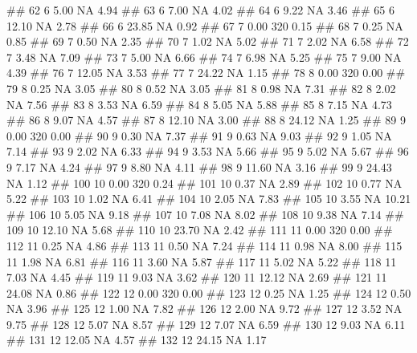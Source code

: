 \documentclass[10pt,]{krantz}
\makeatletter
\newenvironment{Shaded}{\begin{snugshade}}{\end{snugshade}}
\newcommand{\NormalTok}[1]{#1}
\newenvironment{kframe}{%
\medskip{}
\setlength{\fboxsep}{.8em}
 \def\at@end@of@kframe{}%
 \ifinner\ifhmode%
  \def\at@end@of@kframe{\end{minipage}}%
  \begin{minipage}{\columnwidth}%
 \fi\fi%
 \def\FrameCommand##1{\hskip\@totalleftmargin \hskip-\fboxsep
 \colorbox{shadecolor}{##1}\hskip-\fboxsep
     \hskip-\linewidth \hskip-\@totalleftmargin \hskip\columnwidth}%
 \MakeFramed {\advance\hsize-\width
   \@totalleftmargin\z@ \linewidth\hsize
   \@setminipage}}%
 {\par\unskip\endMakeFramed%
 \at@end@of@kframe}
\renewenvironment{Shaded}{\begin{kframe}}{\end{kframe}}
\theoremstyle{definition}
\theoremstyle{definition}
\theoremstyle{remark}
\makeatother
\begin{document}
\begin{Shaded}
\begin{Highlighting}[]
\NormalTok{## 62   6  5.00  NA  4.94}
\NormalTok{## 63   6  7.00  NA  4.02}
\NormalTok{## 64   6  9.22  NA  3.46}
\NormalTok{## 65   6 12.10  NA  2.78}
\NormalTok{## 66   6 23.85  NA  0.92}
\NormalTok{## 67   7  0.00 320  0.15}
\NormalTok{## 68   7  0.25  NA  0.85}
\NormalTok{## 69   7  0.50  NA  2.35}
\NormalTok{## 70   7  1.02  NA  5.02}
\NormalTok{## 71   7  2.02  NA  6.58}
\NormalTok{## 72   7  3.48  NA  7.09}
\NormalTok{## 73   7  5.00  NA  6.66}
\NormalTok{## 74   7  6.98  NA  5.25}
\NormalTok{## 75   7  9.00  NA  4.39}
\NormalTok{## 76   7 12.05  NA  3.53}
\NormalTok{## 77   7 24.22  NA  1.15}
\NormalTok{## 78   8  0.00 320  0.00}
\NormalTok{## 79   8  0.25  NA  3.05}
\NormalTok{## 80   8  0.52  NA  3.05}
\NormalTok{## 81   8  0.98  NA  7.31}
\NormalTok{## 82   8  2.02  NA  7.56}
\NormalTok{## 83   8  3.53  NA  6.59}
\NormalTok{## 84   8  5.05  NA  5.88}
\NormalTok{## 85   8  7.15  NA  4.73}
\NormalTok{## 86   8  9.07  NA  4.57}
\NormalTok{## 87   8 12.10  NA  3.00}
\NormalTok{## 88   8 24.12  NA  1.25}
\NormalTok{## 89   9  0.00 320  0.00}
\NormalTok{## 90   9  0.30  NA  7.37}
\NormalTok{## 91   9  0.63  NA  9.03}
\NormalTok{## 92   9  1.05  NA  7.14}
\NormalTok{## 93   9  2.02  NA  6.33}
\NormalTok{## 94   9  3.53  NA  5.66}
\NormalTok{## 95   9  5.02  NA  5.67}
\NormalTok{## 96   9  7.17  NA  4.24}
\NormalTok{## 97   9  8.80  NA  4.11}
\NormalTok{## 98   9 11.60  NA  3.16}
\NormalTok{## 99   9 24.43  NA  1.12}
\NormalTok{## 100 10  0.00 320  0.24}
\NormalTok{## 101 10  0.37  NA  2.89}
\NormalTok{## 102 10  0.77  NA  5.22}
\NormalTok{## 103 10  1.02  NA  6.41}
\NormalTok{## 104 10  2.05  NA  7.83}
\NormalTok{## 105 10  3.55  NA 10.21}
\NormalTok{## 106 10  5.05  NA  9.18}
\NormalTok{## 107 10  7.08  NA  8.02}
\NormalTok{## 108 10  9.38  NA  7.14}
\NormalTok{## 109 10 12.10  NA  5.68}
\NormalTok{## 110 10 23.70  NA  2.42}
\NormalTok{## 111 11  0.00 320  0.00}
\NormalTok{## 112 11  0.25  NA  4.86}
\NormalTok{## 113 11  0.50  NA  7.24}
\NormalTok{## 114 11  0.98  NA  8.00}
\NormalTok{## 115 11  1.98  NA  6.81}
\NormalTok{## 116 11  3.60  NA  5.87}
\NormalTok{## 117 11  5.02  NA  5.22}
\NormalTok{## 118 11  7.03  NA  4.45}
\NormalTok{## 119 11  9.03  NA  3.62}
\NormalTok{## 120 11 12.12  NA  2.69}
\NormalTok{## 121 11 24.08  NA  0.86}
\NormalTok{## 122 12  0.00 320  0.00}
\NormalTok{## 123 12  0.25  NA  1.25}
\NormalTok{## 124 12  0.50  NA  3.96}
\NormalTok{## 125 12  1.00  NA  7.82}
\NormalTok{## 126 12  2.00  NA  9.72}
\NormalTok{## 127 12  3.52  NA  9.75}
\NormalTok{## 128 12  5.07  NA  8.57}
\NormalTok{## 129 12  7.07  NA  6.59}
\NormalTok{## 130 12  9.03  NA  6.11}
\NormalTok{## 131 12 12.05  NA  4.57}
\NormalTok{## 132 12 24.15  NA  1.17}
\end{Highlighting}
\end{Shaded}
\end{document}
